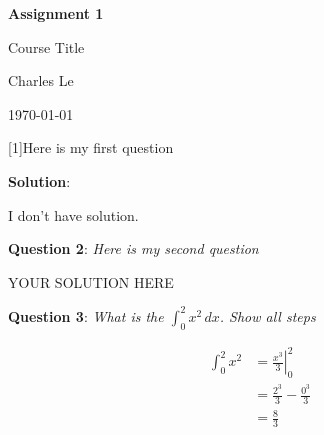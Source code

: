 \documentclass[15pt, a4paper]{article}
\newcommand{\question}[2][]{
    \begin{flushleft}
        \textbf{Question #1}: \textit{#2}
    \end{flushleft}}
\newcommand{\sol}{
    \begin{flushleft}
        \textbf{Solution}:
    \end{flushleft}}
\newcommand{\maketitletwo}[2][]{
\begin{center}
    \Large{\textbf{Assignment #1}
    
        Course Title} %
    \vspace{5pt} %
    
    \normalsize{Charles Le  %
        
    \today}        %
    \vspace{20pt} %
\end{center}}
\begin{document}
    \maketitletwo[1]  %
    
    \question[1]{Here is my first question}
    
    \sol{I don't have solution.}
    
    \question[2]{Here is my second question}
    
    YOUR SOLUTION HERE
    
    \question[3]{What is the \Large{$\int_0^2 x^2 \, dx$}\normalsize{. Show all steps}}
    
    \begin{align*}
        \int_0^2 x^2 &= \left. \frac{x^3}{3} \right|_0^2 \\
                &= \frac{2^3}{3}-\frac{0^3}{3}\\
                &= \frac{8}{3}
    \end{align*}
\end{document}
